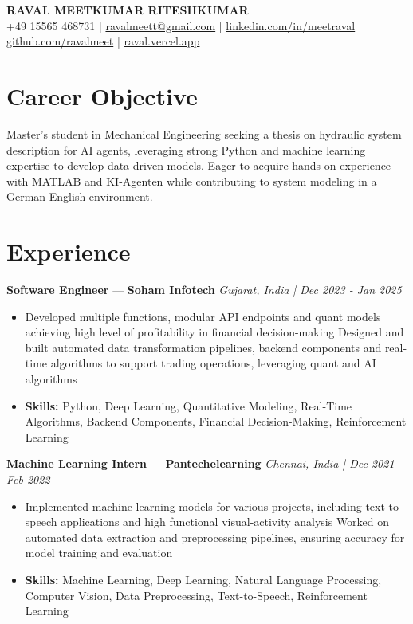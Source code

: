 \documentclass[a4paper,10pt]{article}
\begin{document}
\begin{center}
  {\Large\bfseries RAVAL MEETKUMAR RITESHKUMAR}\\[2pt]
  {\small +49 15565 468731 \;|\; \href{mailto:ravalmeett@gmail.com}{ravalmeett@gmail.com} \;|\; \href{https://www.linkedin.com/in/meetraval/}{linkedin.com/in/meetraval} \;|\; \href{https://github.com/ravalmeet}{github.com/ravalmeet} \;|\; \href{https://raval.vercel.app/}{raval.vercel.app}}
\end{center}
\vspace{-3pt}

\section*{Career Objective}
Master's student in Mechanical Engineering seeking a thesis on hydraulic system description for AI agents, leveraging strong Python and machine learning expertise to develop data-driven models. Eager to acquire hands-on experience with MATLAB and KI-Agenten while contributing to system modeling in a German-English environment.\par

\section*{Experience}
\textbf{Software Engineer} — \textbf{Soham Infotech} \hfill \textit{Gujarat, India \;|\; Dec 2023 - Jan 2025}\par
\vspace{1pt}
\begin{itemize}
  \item Developed multiple functions, modular API endpoints and quant models achieving high level of profitability in financial decision-making Designed and built automated data transformation pipelines, backend components and real-time algorithms to support trading operations, leveraging quant and AI algorithms
  \item \textbf{Skills:} Python, Deep Learning, Quantitative Modeling, Real-Time Algorithms, Backend Components, Financial Decision-Making, Reinforcement Learning
\end{itemize}
\vspace{3pt}
\textbf{Machine Learning Intern} — \textbf{Pantechelearning} \hfill \textit{Chennai, India \;|\; Dec 2021 - Feb 2022}\par
\vspace{1pt}
\begin{itemize}
  \item Implemented machine learning models for various projects, including text-to-speech applications and high functional visual-activity analysis Worked on automated data extraction and preprocessing pipelines, ensuring accuracy for model training and evaluation
  \item \textbf{Skills:} Machine Learning, Deep Learning, Natural Language Processing, Computer Vision, Data Preprocessing, Text-to-Speech, Reinforcement Learning
\end{itemize}
\end{document}
